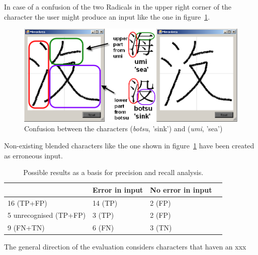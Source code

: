In case of a confusion of the two Radicals in the upper right corner of 
the character the user might produce an input like the one in 
figure~\ref{fig:eval:hybrid935and117}.
\begin{figure}[htbp]
  \begin{center}
    \includegraphics[scale=0.57]{images/char935and117HybridMarked.png}
    \caption{Confusion between the characters  (\emph{botsu}, 'sink') and  (\emph{umi}, 'sea')}
    \label{fig:eval:hybrid935and117}
  \end{center}
\end{figure}
Non-existing blended characters like the one shown in 
figure~\ref{fig:eval:hybrid935and117} have been created as erroneous input.

\begin{table}[htbp]
\begin{center}
  \begin{tabular}{|l|l|l|p{200pt}|}
    \hline
                           & Error in input      & No error in input \\
    \hline
    16 (TP+FP)             & 14 (TP)             & 2 (FP) \\
    \hline
    5 unrecognised (TP+FP) & 3 (TP)              & 2 (FP) \\
    \hline
    9 (FN+TN)              & 6 (FN)              & 3 (TN) \\
    \hline
  \end{tabular}
\end{center}
\caption{Possible results as a basis for precision and recall analysis.}
\label{table:eval:resultsprecisionandrecallnumbers}
\end{table}
The general direction of the evaluation considers characters that haven
an xxx